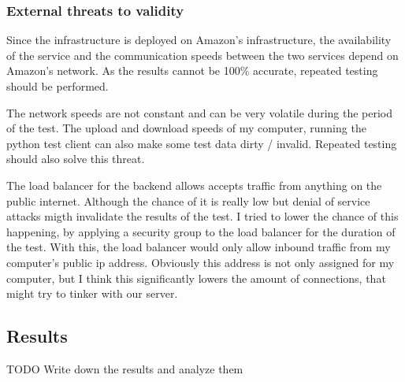 			\subsubsection{External threats to validity}
			Since the infrastructure is deployed on Amazon's infrastructure, the availability of the service and the communication speeds between the two services 
			depend on Amazon's network. As the results cannot be 100\% accurate, repeated testing should be
			performed.

			The network speeds are not constant and can be very volatile during the period of the test. The upload and download speeds of my computer, running the 
			python test client can also make some test data dirty / invalid.  Repeated testing should also solve this threat.

			The load balancer for the backend allows accepts traffic from anything on the public internet. Although the chance of it is really low
			but denial of service attacks migth invalidate the results of the test. I tried to lower the chance of this happening, by applying a security group
			to the load balancer for the duration of the test. With this, the load balancer would only allow inbound traffic from my computer's public ip address.
			Obviously this address is not only assigned for my computer, but I think this significantly lowers the amount of connections, that might try to tinker
			with our server.

		\subsection{Results}
		TODO Write down the results and analyze them